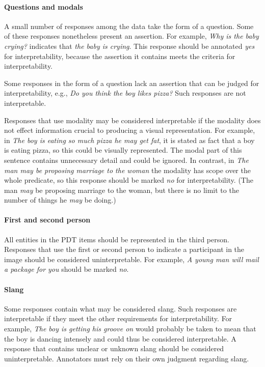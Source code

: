 \documentclass[12pt]{article}
\begin{document}
\paragraph{Questions and modals} \label{para:interp-question} A small number of responses among the data take the form of a question. Some of these responses nonetheless present an assertion. For example, \textit{Why is the baby crying?} indicates that \textit{the baby is crying}. This response should be annotated \textit{yes} for interpretability, because the assertion it contains meets the criteria for interpretability.

Some responses in the form of a question lack an assertion that can be judged for interpretability, e.g., \textit{Do you think the boy likes pizza?} Such responses are not interpretable.

Responses that use modality may be considered interpretable if the modality does not effect information crucial to producing a visual representation. For example, in \textit{The boy is eating so much pizza he may get fat}, it is stated as fact that a boy is eating pizza, so this could be visually represented. The modal part of this sentence contains unnecessary detail and could be ignored. In contrast, in \textit{The man may be proposing marriage to the woman} the modality has scope over the whole predicate, so this response should be marked \textit{no} for interpretability. (The man \textit{may} be proposing marriage to the woman, but there is no limit to the number of things he \textit{may} be doing.)

\paragraph{First and second person} All entities in the PDT items should be represented in the third person. Responses that use the first or second person to indicate a participant in the image should be considered uninterpretable. For example, \textit{A young man will mail a package for you} should be marked \textit{no}. 

\paragraph{Slang} Some responses contain what may be considered slang. Such responses are interpretable if they meet the other requirements for interpretability. For example, \textit{The boy is getting his groove on} would probably be taken to mean that the boy is dancing intensely and could thus be considered interpretable. A response that contains unclear or unknown slang should be considered uninterpretable. Annotators must rely on their own judgment regarding slang.
\end{document}
